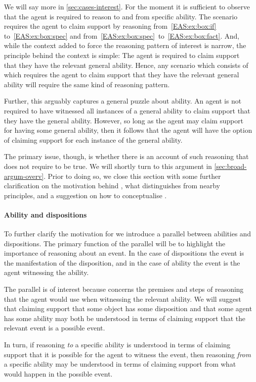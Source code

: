 \begin{note}[Point]
  We will say more in \autoref{sec:cases-interest}.
  For the moment it is sufficient to observe that the agent is required to reason to and from specific ability.
  The scenario requires the agent to claim support by reasoning from~\ref{EAS:ex:box:if} to~\ref{EAS:ex:box:spec} and from~\ref{EAS:ex:box:spec}~to~\ref{EAS:ex:box:fact}.
  And, while the context added to force the reasoning pattern of interest is narrow, the principle behind the context is simple:
  The agent is required to claim support that they have the relevant general ability.
  Hence, any scenario which consists of \gsi{-} which requires the agent to claim support that they have the relevant general ability will require the same kind of reasoning pattern.

  Further, this arguably captures a general puzzle about ability.
  An agent is not required to have witnessed all instances of a general ability to claim support that they have the general ability.
  However, so long as the agent may claim support for having some general ability, then it follows that the agent will have the option of claiming support for each instance of the general ability.

  The primary issue, though, is whether there is an account of such reasoning that does not require \EAS{} to be true.
  We will shortly turn to this argument in \autoref{sec:broad-argum-overv}.
  Prior to doing so, we close this section with some further clarification on the motivation behind \EAS{}, what distinguishes \EAS{} from nearby principles, and a suggestion on how to conceptualise \EAS{}.
\end{note}

\paragraph{Ability and dispositions}

\begin{note}[Parallel]
  To further clarify the motivation for \EAS{} we introduce a parallel between abilities and dispositions.
  The primary function of the parallel will be to highlight the importance of reasoning about an event.
  In the case of dispositions the event is the manifestation of the disposition, and in the case of ability the event is the agent witnessing the ability.

  The parallel is of interest because \EAS{} concerns the premises and steps of reasoning that the agent would use when witnessing the relevant ability.
  We will suggest that claiming support that some object has some disposition and that some agent has some ability may both be understood in terms of claiming support that the relevant event is a possible event.

  In turn, if reasoning \emph{to} a specific ability is understood in terms of claiming support that it is possible for the agent to witness the event, then reasoning \emph{from} a specific ability may be understood in terms of claiming support from what would happen in the possible event.
  \end{note}

